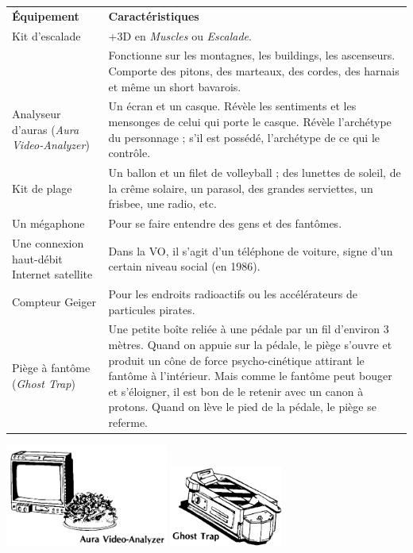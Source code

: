 \begin{frame}[b]
{\begin{minipage}[c][0.95\textheight][c]{\linewidth}
\begin{center}
\begin{tabular}{>{\raggedright\arraybackslash}p{1.8cm} p{6cm}}
\textbf{Équipement} & \textbf{Caractéristiques}\\
Kit d'escalade & +3D en \textit{Muscles} ou \textit{Escalade}. \\
& Fonctionne sur les montagnes, les buildings, les ascenseurs. Comporte des pitons, des marteaux, des cordes, des harnais et même un short bavarois.\\
Analyseur d'auras (\textit{Aura Video-Analyzer})& Un écran et un casque. Révèle les sentiments et les mensonges de celui qui porte le casque. Révèle l'archétype du personnage ; s'il est possédé, l'archétype de ce qui le contrôle.\\
Kit de plage & Un ballon et un filet de volleyball ; des lunettes de soleil, de la crême solaire, un parasol, des grandes serviettes, un frisbee, une radio, etc. \\
Un mégaphone & Pour se faire entendre des gens et des fantômes. \\
Une connexion haut-débit Internet satellite & Dans la VO, il s'agit d'un téléphone de voiture, signe d'un certain niveau social (en 1986). \\
Compteur \newline Geiger & Pour les endroits radioactifs ou les accélérateurs de particules pirates. \\
Piège à fantôme (\textit{Ghost Trap})& Une petite boîte reliée à une pédale par un fil d'environ 3 mètres. Quand on appuie sur la pédale, le piège s'ouvre et produit un cône de force psycho-cinétique attirant le fantôme à l'intérieur. Mais comme le fantôme peut bouger et s'éloigner, il est bon de le retenir avec un canon à protons. Quand on lève le pied de la pédale, le piège se referme. \\
\end{tabular}
\end{center}

\begin{center}
\includegraphics[width=0.4\textwidth]{./images/aura-analyseur.png} \hspace{0.5cm}  \includegraphics[width=0.28\textwidth]{./images/ghost-trap.png}\textsl{}
\end{center}


\end{minipage}}
\end{frame}
